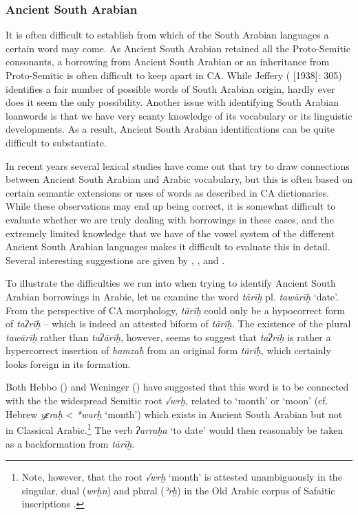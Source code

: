\documentclass[output=paper]{langsci/langscibook}
\begin{document}
\subsubsection{\label{bkm:Ref13224682}Ancient South Arabian}

It is often difficult to establish from which of the South Arabian languages a certain word may come. As Ancient South Arabian retained all the Proto-Semitic consonants, a borrowing from Ancient South Arabian or an inheritance from Proto-Semitic is often difficult to keep apart in CA. While Jeffery (\citeyear{Jeffrey2007} [1938]: 305) identifies a fair number of possible words of South Arabian origin, hardly ever does it seem the only possibility. Another issue with identifying South Arabian loanwords is that we have very scanty knowledge of its vocabulary or its linguistic developments. As a result, Ancient South Arabian identifications can be quite difficult to substantiate.

In recent years several lexical studies have come out that try to draw connections between Ancient South Arabian and Arabic vocabulary, but this is often based on certain semantic extensions or uses of words as described in CA dictionaries. While these observations may end up being correct, it is somewhat difficult to evaluate whether we are truly dealing with borrowings in these cases, and the extremely limited knowledge that we have of the vowel system of the different Ancient South Arabian languages makes it difficult to evaluate this in detail. Several interesting suggestions are given by  \cite{Weninger2009},  \cite{Hayajneh2011},  \cite{Elmaz2014} and  \cite{Elmaz2016}. 

To illustrate the difficulties we run into when trying to identify Ancient South Arabian borrowings in Arabic, let us examine the word \textit{tārīḫ} pl. \textit{tawārīḫ} ‘date’. From the perspective of CA morphology, \textit{tārīḫ} could only be a hypocorrect form of \textit{taʔrīḫ} – which is indeed an attested biform of \textit{tārīḫ}. The existence of the plural \textit{tawārīḫ} rather than \textit{taʔārīḫ}, however, seems to suggest that \textit{taʔrīḫ} is rather a hypercorrect insertion of \textit{hamzah} from an original form \textit{tārīḫ}, which certainly looks foreign in its formation.

Both Hebbo (\citeyear[27]{Hebbo1984}) and Weninger (\citeyear[399]{Weninger2009}) have suggested that this word is to be connected with the the widespread Semitic root \textit{√wrḫ}, related to ‘month’ or ‘moon’ (cf. Hebrew \textit{yɛraḥ} < \textit{*warḫ} ‘month’) which exists in Ancient South Arabian but not in Classical Arabic.\footnote{Note, however, that the root \textit{√wrḫ} ‘month’ is attested unambiguously in the singular, dual (\textit{wrḫn}) and plural (\textit{ʾrḫ}) in the Old Arabic corpus of Safaitic inscriptions \citep[353]{Al-Jallad2015Safaitic}.} The verb \textit{ʔarraḫa} ‘to date’ would then reasonably be taken as a backformation from \textit{tārīḫ}.
\end{document}
